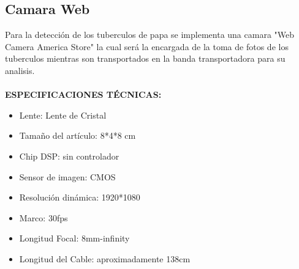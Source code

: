 		\subsection{Camara Web}
			Para la detección de los tuberculos de papa se implementa una camara "Web Camera America Store" la cual será la encargada de la toma de fotos de los tuberculos mientras son transportados en la banda transportadora para su analisis.
			\\
			\\
			\textbf{ESPECIFICACIONES TÉCNICAS:}
			\begin{itemize}
				\item Lente: Lente de Cristal
				\item Tamaño del artículo: 8*4*8 cm
				\item Chip DSP: sin controlador
				\item Sensor de imagen: CMOS
				\item Resolución dinámica: 1920*1080
				\item Marco: 30fps
				\item Longitud Focal: 8mm-infinity
				\item Longitud del Cable: aproximadamente 138cm
			\end{itemize}
			















